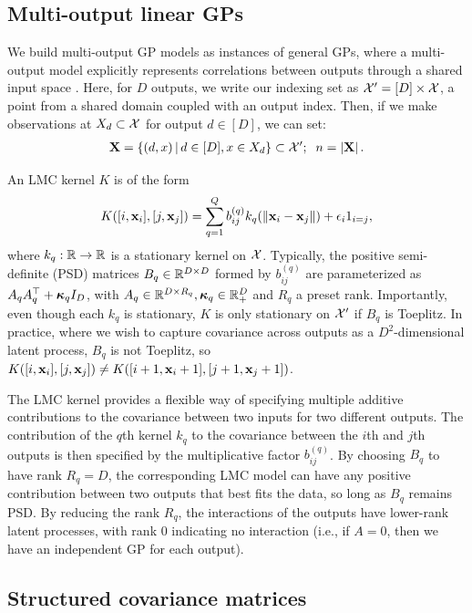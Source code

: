 \documentclass{article}
\begin{document}
\subsection{Multi-output linear GPs}

We build multi-output GP models as instances of general GPs, where a multi-output model explicitly represents correlations between outputs through a shared input space \cite{alvarez2012kernels}. Here, for $D$ outputs, we write our indexing set as $\mathcal{X}'=[D]\times \mathcal{X}$, a point from a shared domain coupled with an output index. Then, if we make observations at $X_d\subset\mathcal{X}$ for output $d\in[D]$, we can set:
\begin{align*}
\textbf{X}=\left\{ (d, x) \,\middle|\, d\in[D],x\in X_d \right\}\subset{\mathcal{X}'};\;\; n=\left\vert{\textbf{X}}\right\vert.
\end{align*}

An LMC kernel $K$ is of the form 
\begin{align}
K([i,\textbf{x}_i],[j,\textbf{x}_j])=\sum_{q=1}^Qb_{ij}^{(q)}k_q(\left\| \textbf{x}_i-\textbf{x}_j \right\|)+\epsilon_i1_{i=j},\label{lmcpointwise}
\end{align} 
where $k_q:\mathbb{R}\rightarrow\mathbb{R}$ is a stationary kernel on $\mathcal{X}$. Typically, the positive semi-definite (PSD) matrices $B_q\in\mathbb{R}^{D\times D}$ formed by $b_{ij}^{(q)}$ are parameterized as $A_qA_q^\top+{\boldsymbol\kappa}_q I_D$, with $A_q\in\mathbb{R}^{D\times R_q},{\boldsymbol\kappa}_q\in\mathbb{R}_+^D$ and $R_q$ a preset rank. Importantly, even though each $k_q$ is stationary, $K$ is only stationary on $\mathcal{X}'$ if $B_q$ is Toeplitz. In practice, where we wish to capture covariance across outputs as a $D^2$-dimensional latent process, $B_q$ is not Toeplitz, so $K([i,\textbf{x}_i],[j,\textbf{x}_j])\neq K([i+1,\textbf{x}_i+1],[j+1,\textbf{x}_j+1])$.

The LMC kernel provides a flexible way of specifying multiple additive contributions to the covariance between two inputs for two different outputs. The contribution of the $q$th kernel $k_q$ to the covariance between the $i$th and $j$th outputs is then specified by the multiplicative factor $b_{ij}^{(q)}$. By choosing $B_q$ to have rank $R_q=D$, the corresponding LMC model can have any positive contribution between two outputs that best fits the data, so long as $B_q$ remains PSD. By reducing the rank $R_q$, the interactions of the outputs have lower-rank latent processes, with rank 0 indicating no interaction (i.e., if $A=0$, then we have an independent GP for each output).

\subsection{Structured covariance matrices}
\end{document}
